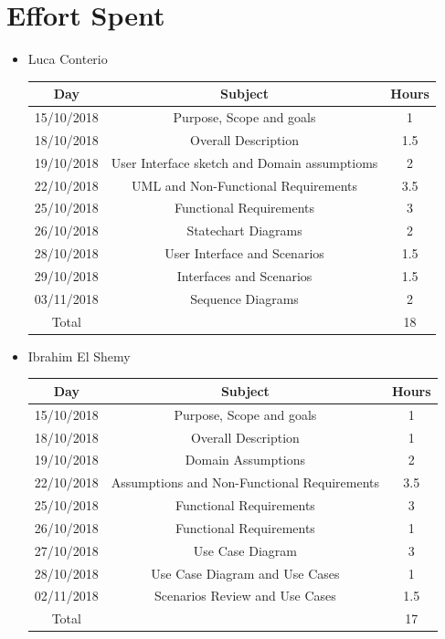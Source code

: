 \documentclass[12pt,a4paper]{article}
\begin{document}
	\section{Effort Spent}
	\begin{itemize}
		\item Luca Conterio
		\begin{center}
			\begin{tabular}{| c | c | c |}
				\hline
				Day & Subject & Hours \\ \hline
				15/10/2018 & Purpose, Scope and goals & 1 \\
				18/10/2018 & Overall Description & 1.5 \\
				19/10/2018  & User Interface sketch and Domain assumptioms & 2 \\
				22/10/2018  & UML and Non-Functional Requirements & 3.5 \\
				25/10/2018 & Functional Requirements & 3 \\
				26/10/2018 & Statechart Diagrams & 2 \\
				28/10/2018 & User Interface and Scenarios & 1.5 \\
				29/10/2018 & Interfaces and Scenarios & 1.5 \\
				03/11/2018 & Sequence Diagrams & 2 \\
				\hline
				Total & & 18 \\
				\hline
			\end{tabular}
		\end{center}

		\item Ibrahim El Shemy
		\begin{center}
			\begin{tabular}{| c | c | c |}
				\hline
				Day & Subject & Hours \\ \hline
				15/10/2018 & Purpose, Scope and goals & 1 \\
				18/10/2018 & Overall Description & 1 \\
				19/10/2018  & Domain Assumptions & 2 \\
				22/10/2018  & Assumptions and Non-Functional Requirements & 3.5 \\
				25/10/2018 & Functional Requirements & 3 \\
				26/10/2018 & Functional Requirements & 1 \\
				27/10/2018 & Use Case Diagram & 3 \\
				28/10/2018 & Use Case Diagram and Use Cases & 1 \\
				02/11/2018 & Scenarios Review and Use Cases & 1.5 \\
				\hline
				Total & & 17 \\
				\hline
			\end{tabular}
		\end{center}
	\end{itemize}
\end{document}
